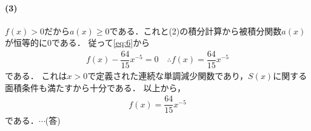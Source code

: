 \documentclass[../../main.tex]{subfiles}
\begin{document}
\paragraph{(3)}

$f(x)>0$だから$a(x) \ge 0$である．これと(2)の積分計算から被積分関数$a(x)$が恒等的に$0$である．
従って\cref{eq:6}から
\begin{align}
  f(x)-\dfrac{64}{15}x^{-5} = 0 \quad \therefore
  f(x) = \dfrac{64}{15}x^{-5}
\end{align}
である．
これは$x>0$で定義された連続な単調減少関数であり，$S(x)$に関する面積条件も満たすから十分である．
以上から，
\begin{align}
  f(x)=\dfrac{64}{15}x^{-5}
\end{align}
である．$\cdots$(答)
\end{document}
